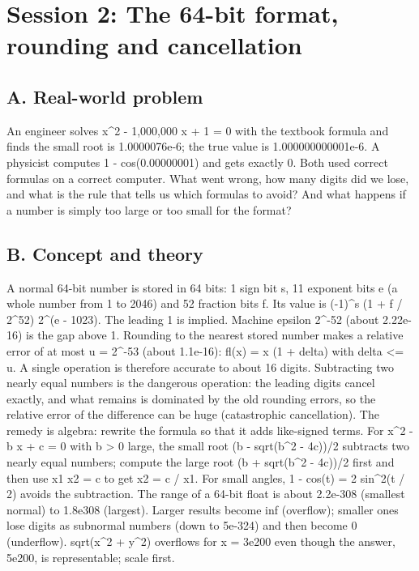\documentclass[11pt,a4paper]{article}
\begin{document}
\section{Session 2: The 64-bit format, rounding and cancellation}

\subsection*{A. Real-world problem}
An engineer solves x\textasciicircum{}2 - 1,000,000 x + 1 = 0 with the textbook formula and finds the small root is 1.0000076e-6; the true value is 1.000000000001e-6. A physicist computes 1 - cos(0.00000001) and gets exactly 0. Both used correct formulas on a correct computer. What went wrong, how many digits did we lose, and what is the rule that tells us which formulas to avoid? And what happens if a number is simply too large or too small for the format?

\subsection*{B. Concept and theory}
A normal 64-bit number is stored in 64 bits: 1 sign bit s, 11 exponent bits e (a whole number from 1 to 2046) and 52 fraction bits f. Its value is (-1)\textasciicircum{}s (1 + f / 2\textasciicircum{}52) 2\textasciicircum{}(e - 1023). The leading 1 is implied. Machine epsilon 2\textasciicircum{}-52 (about 2.22e-16) is the gap above 1. Rounding to the nearest stored number makes a relative error of at most u = 2\textasciicircum{}-53 (about 1.1e-16): fl(x) = x (1 + delta) with \textbar{}delta\textbar{} \textless{}= u. A single operation is therefore accurate to about 16 digits. Subtracting two nearly equal numbers is the dangerous operation: the leading digits cancel exactly, and what remains is dominated by the old rounding errors, so the relative error of the difference can be huge (catastrophic cancellation). The remedy is algebra: rewrite the formula so that it adds like-signed terms. For x\textasciicircum{}2 - b x + c = 0 with b \textgreater{} 0 large, the small root (b - sqrt(b\textasciicircum{}2 - 4c))/2 subtracts two nearly equal numbers; compute the large root (b + sqrt(b\textasciicircum{}2 - 4c))/2 first and then use x1 x2 = c to get x2 = c / x1. For small angles, 1 - cos(t) = 2 sin\textasciicircum{}2(t / 2) avoids the subtraction. The range of a 64-bit float is about 2.2e-308 (smallest normal) to 1.8e308 (largest). Larger results become inf (overflow); smaller ones lose digits as subnormal numbers (down to 5e-324) and then become 0 (underflow). sqrt(x\textasciicircum{}2 + y\textasciicircum{}2) overflows for x = 3e200 even though the answer, 5e200, is representable; scale first.
\end{document}
